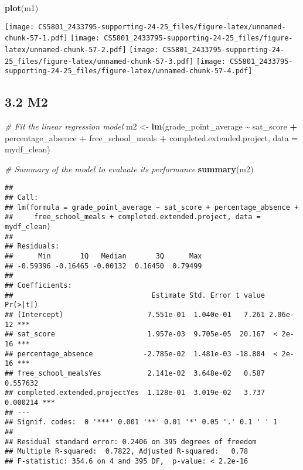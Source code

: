 \documentclass[
]{article}
\newenvironment{Shaded}{\begin{snugshade}}{\end{snugshade}}
\newcommand{\AttributeTok}[1]{\textcolor[rgb]{0.13,0.29,0.53}{#1}}
\newcommand{\CommentTok}[1]{\textcolor[rgb]{0.56,0.35,0.01}{\textit{#1}}}
\newcommand{\FunctionTok}[1]{\textcolor[rgb]{0.13,0.29,0.53}{\textbf{#1}}}
\newcommand{\NormalTok}[1]{#1}
\newcommand{\OtherTok}[1]{\textcolor[rgb]{0.56,0.35,0.01}{#1}}
\newcommand{\SpecialCharTok}[1]{\textcolor[rgb]{0.81,0.36,0.00}{\textbf{#1}}}
\begin{document}
\begin{Shaded}
\begin{Highlighting}[]
\FunctionTok{plot}\NormalTok{(m1)}
\end{Highlighting}
\end{Shaded}

\texttt{[image: CS5801\_2433795-supporting-24-25\_files/figure-latex/unnamed-chunk-57-1.pdf]}
\texttt{[image: CS5801\_2433795-supporting-24-25\_files/figure-latex/unnamed-chunk-57-2.pdf]}
\texttt{[image: CS5801\_2433795-supporting-24-25\_files/figure-latex/unnamed-chunk-57-3.pdf]}
\texttt{[image: CS5801\_2433795-supporting-24-25\_files/figure-latex/unnamed-chunk-57-4.pdf]}

\subsection{3.2 M2}\label{m2}

\begin{Shaded}
\begin{Highlighting}[]
\CommentTok{\# Fit the linear regression model}
\NormalTok{m2 }\OtherTok{\textless{}{-}} \FunctionTok{lm}\NormalTok{(grade\_point\_average }\SpecialCharTok{\textasciitilde{}}\NormalTok{ sat\_score }\SpecialCharTok{+}\NormalTok{ percentage\_absence }\SpecialCharTok{+}\NormalTok{ free\_school\_meals }\SpecialCharTok{+}\NormalTok{ completed.extended.project, }\AttributeTok{data =}\NormalTok{ mydf\_clean)}

\CommentTok{\# Summary of the model to evaluate its performance}
\FunctionTok{summary}\NormalTok{(m2)}
\end{Highlighting}
\end{Shaded}

\begin{verbatim}
## 
## Call:
## lm(formula = grade_point_average ~ sat_score + percentage_absence + 
##     free_school_meals + completed.extended.project, data = mydf_clean)
## 
## Residuals:
##      Min       1Q   Median       3Q      Max 
## -0.59396 -0.16465 -0.00132  0.16450  0.79499 
## 
## Coefficients:
##                                 Estimate Std. Error t value Pr(>|t|)    
## (Intercept)                    7.551e-01  1.040e-01   7.261 2.06e-12 ***
## sat_score                      1.957e-03  9.705e-05  20.167  < 2e-16 ***
## percentage_absence            -2.785e-02  1.481e-03 -18.804  < 2e-16 ***
## free_school_mealsYes           2.141e-02  3.648e-02   0.587 0.557632    
## completed.extended.projectYes  1.128e-01  3.019e-02   3.737 0.000214 ***
## ---
## Signif. codes:  0 '***' 0.001 '**' 0.01 '*' 0.05 '.' 0.1 ' ' 1
## 
## Residual standard error: 0.2406 on 395 degrees of freedom
## Multiple R-squared:  0.7822, Adjusted R-squared:   0.78 
## F-statistic: 354.6 on 4 and 395 DF,  p-value: < 2.2e-16
\end{verbatim}
\end{document}
